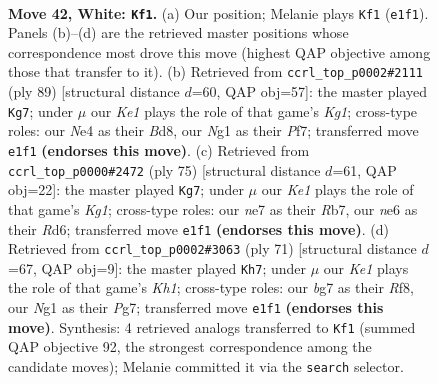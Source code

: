 \documentclass[11pt]{article}
\begin{document}
\clearpage

\begin{figure}[p]\centering
\begin{subfigure}{0.46\textwidth}\centering
\resizebox{\linewidth}{!}{%
\newchessgame
\chessboard[
  setfen={3r4/3kn1br/4n1p1/7p/P3N2P/6R1/R5P1/4K1N1 w - - 2 42},
  showmover=false,
  pgfstyle=straightmove, color=movearrow, markmove={e1-f1}
]}
\caption{}
\end{subfigure}\hfill
\begin{subfigure}{0.46\textwidth}\centering
\resizebox{\linewidth}{!}{%
\newchessgame
\chessboard[
  setfen={2rb2k1/5p2/6p1/1PP3r1/2R5/4N2p/4KP2/1R6 b - - 1 45},
  showmover=false,
  pgfstyle=straightmove, color=movearrow, markmove={g8-g7}
]}
\caption{}
\end{subfigure}
\\[4pt]
\begin{subfigure}{0.46\textwidth}\centering
\resizebox{\linewidth}{!}{%
\newchessgame
\chessboard[
  setfen={6k1/pr6/3r2p1/3n3p/7P/R4PP1/2N2RK1/8 b - - 7 38},
  showmover=false,
  pgfstyle=straightmove, color=movearrow, markmove={g8-g7}
]}
\caption{}
\end{subfigure}\hfill
\begin{subfigure}{0.46\textwidth}\centering
\resizebox{\linewidth}{!}{%
\newchessgame
\chessboard[
  setfen={5r1k/6p1/7p/4nr2/3R4/1pN3P1/1P2R1KP/8 b - - 5 36},
  showmover=false,
  pgfstyle=straightmove, color=movearrow, markmove={h8-h7}
]}
\caption{}
\end{subfigure}
\caption{\textbf{Move 42, White: \texttt{Kf1}.} (a) Our position; Melanie plays \texttt{Kf1} (\texttt{e1f1}). Panels (b)--(d) are the retrieved master positions whose correspondence most drove this move (highest QAP objective among those that transfer to it). (b) Retrieved from \texttt{ccrl\_top\_p0002\#2111} (ply 89) [structural distance $d$=60, QAP obj=57]: the master played \texttt{Kg7}; under $\mu$ our \emph{Ke1} plays the role of that game's \emph{Kg1}; cross-type roles: our \emph{N}e4 as their \emph{B}d8, our \emph{N}g1 as their \emph{P}f7; transferred move \texttt{e1f1} \textbf{(endorses this move)}. (c) Retrieved from \texttt{ccrl\_top\_p0000\#2472} (ply 75) [structural distance $d$=61, QAP obj=22]: the master played \texttt{Kg7}; under $\mu$ our \emph{Ke1} plays the role of that game's \emph{Kg1}; cross-type roles: our \emph{n}e7 as their \emph{R}b7, our \emph{n}e6 as their \emph{R}d6; transferred move \texttt{e1f1} \textbf{(endorses this move)}. (d) Retrieved from \texttt{ccrl\_top\_p0002\#3063} (ply 71) [structural distance $d$=67, QAP obj=9]: the master played \texttt{Kh7}; under $\mu$ our \emph{Ke1} plays the role of that game's \emph{Kh1}; cross-type roles: our \emph{b}g7 as their \emph{R}f8, our \emph{N}g1 as their \emph{P}g7; transferred move \texttt{e1f1} \textbf{(endorses this move)}. Synthesis: 4 retrieved analogs transferred to \texttt{Kf1} (summed QAP objective 92, the strongest correspondence among the candidate moves); Melanie committed it via the \texttt{search} selector.}
\label{fig:thought-m82}
\end{figure}
\end{document}
